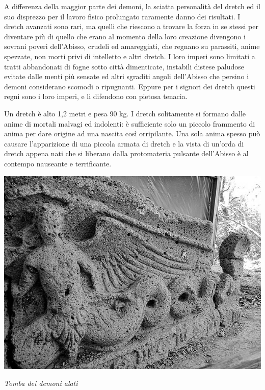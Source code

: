 \begin{multicols}{2}
{A differenza della maggior parte dei demoni, la sciatta personalità del dretch ed il suo disprezzo per il lavoro fisico prolungato raramente danno dei risultati. I dretch avanzati sono rari, ma quelli che riescono a trovare la forza in se stessi per diventare più di quello che erano al momento della loro creazione divengono i sovrani poveri dell'Abisso, crudeli ed amareggiati, che regnano su parassiti, anime spezzate, non morti privi di intelletto e altri dretch. I loro imperi sono limitati a tratti abbandonati di fogne sotto città dimenticate, instabili distese paludose evitate dalle menti più sensate ed altri sgraditi angoli dell'Abisso che persino i demoni considerano scomodi o ripugnanti. Eppure per i signori dei dretch questi regni sono i loro imperi, e li difendono con pietosa tenacia.

Un dretch è alto 1,2 metri e pesa 90 kg. I dretch solitamente si formano dalle anime di mortali malvagi ed indolenti: è sufficiente solo un piccolo frammento di anima per dare origine ad una nascita così orripilante. Una sola anima spesso può causare l'apparizione di una piccola armata di dretch e la vista di un'orda di dretch appena nati che si liberano dalla protomateria pulsante dell'Abisso è al contempo nauseante e terrificante.


\begin{center}
\includegraphics[width=0.9\linewidth]{immagini/Demone_Alato.png}

\emph{Tomba dei demoni alati}
\end{center}

}
\end{multicols}
